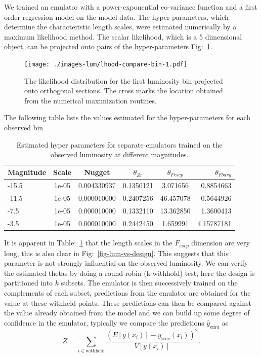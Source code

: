 \documentclass[11pt]{article}
\begin{document}
We trained an emulator with a power-exponential co-variance function and a first order regression model on the model data. The hyper parameters, which determine the characteristic length scales, were estimated numerically by a maximum likelihood method. The scalar likelihood, which is a 5 dimensional object, can be projected onto pairs of the hyper-parameters Fig:~\ref{fig-lhood-contours}. 

\begin{figure}
  \begin{center}
    \texttt{[image: ./images-lum/lhood-compare-bin-1.pdf]}
    \caption{The likelihood distribution for the first luminosity bin projected onto orthogonal sections. The cross marks the location obtained from the numerical maximization routines.} 
    \label{fig-lhood-contours}
  \end{center}
\end{figure}

The following table lists the values estimated for the hyper-parameters for each observed bin
\begin{table}
\begin{center}
\begin{tabular}{l c c c c r}
Magnitude & Scale & Nugget & $\theta_{Zr}$ & $\theta_{Fescp}$ & $\theta_{Fbary}$ \\
\hline
-15.5 & 1e-05 & 0.004330937 & 0.1350121 &  3.071656 & 0.8854663 \\
-11.5 & 1e-05 & 0.000010000 & 0.2407256 & 46.457078 & 0.5644926  \\
-7.5 & 1e-05 & 0.000010000 & 0.1332110 & 13.362850 & 1.3600413 \\
-3.5 & 1e-05 & 0.000010000 & 0.2442450 &  1.659991 & 4.15787181 \\
\end{tabular}
\caption{Estimated hyper parameters for separate emulators trained on the observed luminosity at different magnitudes.}
\label{tab-theta-values-lum}
\end{center}
\end{table}

It is apparent in Table:~\ref{tab-theta-values-lum} that the length scales in the $F_{escp}$ dimension are very long, this is also clear in Fig:~\ref{fig-lum-vs-design}. This suggests that this parameter is not strongly influential on the observed luminosity.
 We can verify the estimated thetas by doing a round-robin (k-withhold) test, here the design is partitioned into $k$ subsets. The emulator is then successively trained on the complements of each subset, predictions from the emulator are obtained for the value at these withheld points. These predictions can then be compared against the value already obtained from the model and we can build up some degree of confidence in the emulator, typically we compare the predictions $\hat{y}_{\mbox{emu}}$  as
\begin{equation}
\label{eqn-z-deviates}
Z = \sum_{i\in\mbox{withheld}}\frac{\left(E[{y}(x_{i})] - y_{\mbox{true}}(x_{i}) \right)^2 }{V[y(x_i)]}.
\end{equation}
\end{document}
